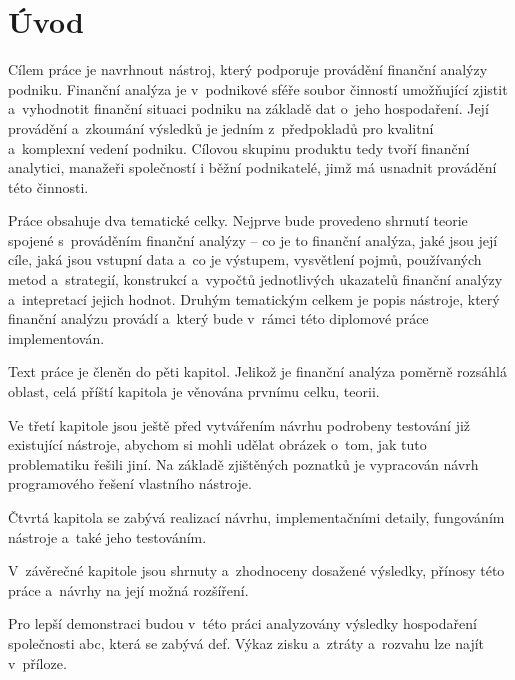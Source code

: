 \chapter{Úvod}
Cílem práce je navrhnout nástroj, který podporuje provádění finanční analýzy podniku. Finanční analýza je v~podnikové sféře soubor činností umožňující zjistit a~vyhodnotit finanční situaci podniku na základě dat o~jeho hospodaření. Její provádění a~zkoumání výsledků je jedním z~předpokladů pro kvalitní a~komplexní vedení podniku. Cílovou skupinu produktu tedy tvoří finanční analytici, manažeři společností i běžní podnikatelé, jimž má usnadnit provádění této činnosti.

Práce obsahuje dva tematické celky. Nejprve bude provedeno shrnutí teorie spojené s~prováděním finanční analýzy -- co je to finanční analýza, jaké jsou její cíle, jaká jsou vstupní data a~co je výstupem, vysvětlení pojmů, používaných metod a~strategií, konstrukcí a~vypočtů jednotlivých ukazatelů finanční analýzy a~intepretací jejich hodnot. 
Druhým tematickým celkem je popis nástroje, který finanční analýzu provádí a~který bude v~rámci této diplomové práce implementován. 

Text práce je členěn do pěti kapitol. Jelikož je finanční analýza poměrně rozsáhlá oblast, celá příští kapitola je věnována prvnímu celku, teorii. 

Ve třetí kapitole jsou ještě před vytvářením návrhu podrobeny testování již existující nástroje, abychom si mohli udělat obrázek o~tom, jak tuto problematiku řešili jiní. Na základě zjištěných poznatků je vypracován návrh programového řešení vlastního nástroje.

Čtvrtá kapitola se zabývá realizací návrhu, implementačními detaily, fungováním nástroje a~také jeho testováním. 

V~závěrečné kapitole jsou shrnuty a~zhodnoceny dosažené výsledky, přínosy této práce a~návrhy na její možná rozšíření.

Pro lepší demonstraci budou v~této práci analyzovány výsledky hospodaření společnosti abc, která se zabývá def. Výkaz zisku a~ztráty a~rozvahu lze najít v~příloze.





























